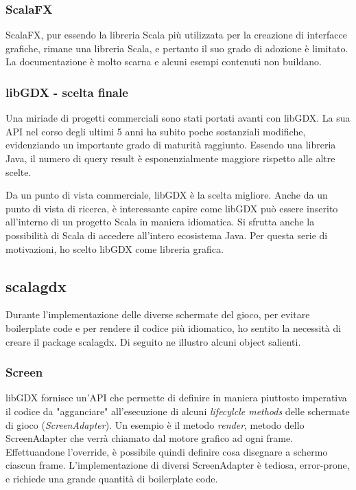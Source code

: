 \subsubsection{ScalaFX}
ScalaFX, pur essendo la libreria Scala più utilizzata per la creazione di interfacce grafiche, rimane una libreria Scala, e pertanto il suo grado di adozione è limitato.
La documentazione è molto scarna e alcuni esempi contenuti non buildano.

\subsubsection{libGDX - scelta finale}
Una miriade di progetti commerciali sono stati portati avanti con libGDX. La sua API nel corso degli ultimi 5 anni ha subito poche sostanziali modifiche, evidenziando un importante grado di maturità raggiunto. Essendo una libreria Java, il numero di query result è esponenzialmente maggiore rispetto alle altre scelte.

Da un punto di vista commerciale, libGDX è la scelta migliore.
Anche da un punto di vista di ricerca, è interessante capire come libGDX può essere inserito all'interno di un progetto Scala in maniera idiomatica. Si sfrutta anche la possibilità di Scala di accedere all'intero ecosistema Java. Per questa serie di motivazioni, ho scelto libGDX come libreria grafica.

\subsection{scalagdx}
Durante l'implementazione delle diverse schermate del gioco, per evitare boilerplate code e per rendere il codice più idiomatico, ho sentito la necessità di creare il package scalagdx. Di seguito ne illustro alcuni object salienti.

\subsubsection{Screen}
libGDX fornisce un'API che permette di definire in maniera piuttosto imperativa il codice da "agganciare" all'esecuzione di alcuni \textit{lifecylcle methods} delle schermate di gioco (\textit{ScreenAdapter}).
Un esempio è il metodo \textit{render}, metodo dello ScreenAdapter che verrà chiamato dal motore grafico ad ogni frame. Effettuandone l'override, è possibile quindi definire cosa disegnare a schermo ciascun frame. L'implementazione di diversi ScreenAdapter è tediosa, error-prone, e richiede una grande quantità di boilerplate code.

